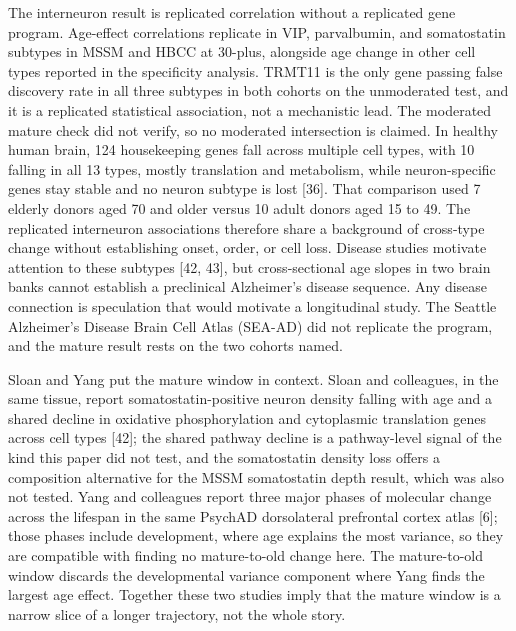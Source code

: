 \documentclass[11pt]{article}
\begin{document}
The interneuron result is replicated correlation without a replicated gene program. Age-effect correlations replicate in VIP, parvalbumin, and somatostatin subtypes in MSSM and HBCC at 30-plus, alongside age change in other cell types reported in the specificity analysis. TRMT11 is the only gene passing false discovery rate in all three subtypes in both cohorts on the unmoderated test, and it is a replicated statistical association, not a mechanistic lead. The moderated mature check did not verify, so no moderated intersection is claimed. In healthy human brain, 124 housekeeping genes fall across multiple cell types, with 10 falling in all 13 types, mostly translation and metabolism, while neuron-specific genes stay stable and no neuron subtype is lost [36]. That comparison used 7 elderly donors aged 70 and older versus 10 adult donors aged 15 to 49. The replicated interneuron associations therefore share a background of cross-type change without establishing onset, order, or cell loss. Disease studies motivate attention to these subtypes [42, 43], but cross-sectional age slopes in two brain banks cannot establish a preclinical Alzheimer's disease sequence. Any disease connection is speculation that would motivate a longitudinal study. The Seattle Alzheimer's Disease Brain Cell Atlas (SEA-AD) did not replicate the program, and the mature result rests on the two cohorts named.

Sloan and Yang put the mature window in context. Sloan and colleagues, in the same tissue, report somatostatin-positive neuron density falling with age and a shared decline in oxidative phosphorylation and cytoplasmic translation genes across cell types [42]; the shared pathway decline is a pathway-level signal of the kind this paper did not test, and the somatostatin density loss offers a composition alternative for the MSSM somatostatin depth result, which was also not tested. Yang and colleagues report three major phases of molecular change across the lifespan in the same PsychAD dorsolateral prefrontal cortex atlas [6]; those phases include development, where age explains the most variance, so they are compatible with finding no mature-to-old change here. The mature-to-old window discards the developmental variance component where Yang finds the largest age effect. Together these two studies imply that the mature window is a narrow slice of a longer trajectory, not the whole story.
\end{document}

